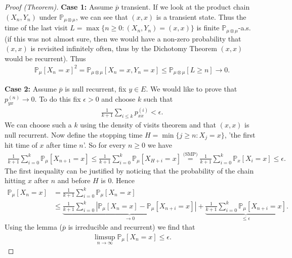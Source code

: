 \begin{proof}[Proof (Theorem)]
	\textbf{Case 1:} Assume $\overline{p}$ transient. If we look at the product chain $(X_n, Y_n)$ under $\mathbb{P}_{\mu \otimes \mu}$, we can see that $(x,x)$ is a transient state. Thus the time of the last visit  $L = \max\{n\geq 0: (X_n, Y_n) = (x,x) \}$ is finite $\mathbb{P}_{\mu \otimes \mu}$-a.s. (if this was not almost sure, then we would have a non-zero probability that $(x,x)$ is revisited infinitely often, thus by the Dichotomy Theorem $(x,x)$ would be recurrent). Thus
\begin{align}
	\mathbb{P}_{\mu } \left[ X_n = x \right]^2 = \mathbb{P}_{\mu \otimes \mu} \left[ X_n =x, Y_n=x \right] \leq \mathbb{P}_{\mu \otimes \mu } \left[ L \geq n \right] \to 0.
\end{align}

\textbf{Case 2:} Assume $\overline{p}$ is null recurrent, fix  $y \in E$. We would like to prove that $p_{yx}^{(n)} \to 0$. To do this fix $\epsilon > 0$ and choose $k$ such that
\begin{align}
	\frac{1}{k+1} \sum_{i\leq k}^{} p_{xx}^{(i)} < \epsilon.
\end{align}
We can choose such a $k$ using the density of visits theorem and that $(x,x)$ is null recurrent. Now define the stopping time $H = \min\{j \geq n: X_j = x\}$, 'the first hit time of $x$ after time $n$'. So for every $n\geq 0$ we have
\begin{align}
	\frac{1}{k+1} \sum_{i=0}^{k} \mathbb{P}_{\mu } \left[ X_{n+1}=x \right]  \leq \frac{1}{k+1} \sum_{i=0}^{k} \mathbb{P}_{\mu } \left[ X_{H+i}=x \right]  
	\stackrel{\textrm{(SMP)}}{=} \frac{1}{k+1} \sum_{i=0}^{k} \mathbb{P}_{x} \left[ X_i =x \right]  \leq \epsilon.
\end{align}
The first inequality can be justified by noticing that the probability of the chain hitting $x$ after $n$ and before $ H$ is 0. Hence
\begin{align}
	\mathbb{P}_{\mu } \left[ X_n = x \right] &= \frac{1}{k+1} \sum_{i=0}^{k} \mathbb{P}_{\mu } \left[ X_n = x \right] \\
						 &\leq \underbrace{\frac{1}{k+1}\sum_{i=0}^{k} \left| \mathbb{P}_{\mu } \left[ X_n = x \right] - \mathbb{P}_{\mu } \left[ X_{n+i} = x \right] \right|}_{\to 0} + \underbrace{\frac{1}{k+1} \sum_{i=0}^{k} \mathbb{P}_{\mu } \left[ X_{n+i}=x \right]}_{\leq \epsilon} 
.\end{align}
Using the lemma ($\overline{p}$ is irreducible and recurrent) we find that
\begin{align}
	\limsup_{n\to\infty} \mathbb{P}_{\mu } \left[ X_n = x \right] \leq \epsilon.
\end{align}


	
\end{proof}



